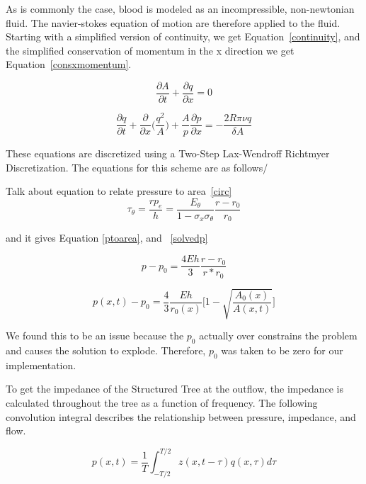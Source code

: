 \documentclass[12pt]{article}
\newcommand{\partder}[2]{\frac{\partial #1}{\partial #2}}
\begin{document}
As is commonly the case, blood is modeled as an incompressible, non-newtonian fluid. The navier-stokes equation of motion are therefore applied to the fluid. Starting with a simplified version of continuity, we get Equation~\eqref{continuity}, and the simplified conservation of momentum in the x direction we get Equation~\eqref{consxmomentum}.

\begin{equation}
	\label{continuity}
	\partder{A}{t} + \partder{q}{x} = 0
\end{equation}

\begin{equation}
	\label{consxmomentum}
	\partder{q}{t} + \partder{}{x}\Bigg(\frac{q^2}{A}\Bigg) + \frac{A}{p}\partder{p}{x} = -\frac{2R\pi \nu q}{\delta A}
\end{equation}

These equations are discretized using a Two-Step Lax-Wendroff Richtmyer Discretization. The equations for this scheme are as follows/

Talk about equation to relate pressure to area~\eqref{circ}
\begin{equation}
	\label{circ}
	\tau_\theta = \frac{r p_e}{h} = \frac{E_\theta}{1-\sigma_x\sigma_\theta}\frac{r-r_0}{r_0}
\end{equation}

and it gives Equation \eqref{ptoarea}, and ~\eqref{solvedp}

\begin{equation}
	\label{ptoarea}
	p-p_0 = \frac{4Eh}{3} \frac{r-r_0}{r*r_0}
\end{equation} 

\begin{equation}
	p(x,t) - p_0 = \frac{4}{3} \frac{Eh}{r_0(x)} \Bigg[1 - \sqrt{\frac{A_0(x)}{A(x,t)}}\Bigg]
	\label{solvedp}
\end{equation}

We found this to be an issue because the $p_0$ actually over constrains the problem and causes the solution to explode. Therefore, $p_0$ was taken to be zero for our implementation.\

To get the impedance of the Structured Tree at the outflow, the impedance is calculated throughout the tree as a function of frequency. The following convolution integral describes the relationship between pressure, impedance, and flow. 

\begin{equation}
p(x,t) = \frac{1}{T} \int_{-T/2}^{T/2} z(x,t-\tau) q(x,\tau) d\tau
\end{equation}
\end{document}
